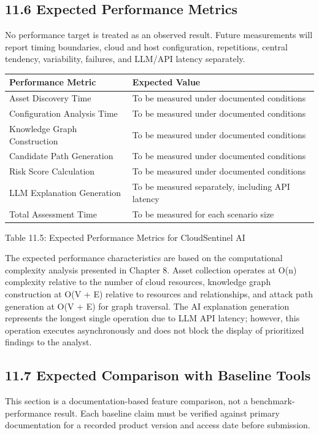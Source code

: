 \subsection{11.6 Expected Performance Metrics}

No performance target is treated as an observed result. Future measurements will report timing boundaries, cloud and host configuration, repetitions, central tendency, variability, failures, and LLM/API latency separately.

\begin{longtable}[]{@{}ll@{}}
\toprule\noalign{}
Performance Metric & Expected Value \\
\midrule\noalign{}
\endhead
\bottomrule\noalign{}
\endlastfoot
Asset Discovery Time & To be measured under documented conditions \\
Configuration Analysis Time & To be measured under documented conditions \\
Knowledge Graph Construction & To be measured under documented conditions \\
Candidate Path Generation & To be measured under documented conditions \\
Risk Score Calculation & To be measured under documented conditions \\
LLM Explanation Generation & To be measured separately, including API latency \\
Total Assessment Time & To be measured for each scenario size \\
\end{longtable}

Table 11.5: Expected Performance Metrics for CloudSentinel AI

The expected performance characteristics are based on the computational complexity analysis presented in Chapter 8. Asset collection operates at O(n) complexity relative to the number of cloud resources, knowledge graph construction at O(V + E) relative to resources and relationships, and attack path generation at O(V + E) for graph traversal. The AI explanation generation represents the longest single operation due to LLM API latency; however, this operation executes asynchronously and does not block the display of prioritized findings to the analyst.

\subsection{11.7 Expected Comparison with Baseline Tools}

This section is a documentation-based feature comparison, not a benchmark-performance result. Each baseline claim must be verified against primary documentation for a recorded product version and access date before submission.

